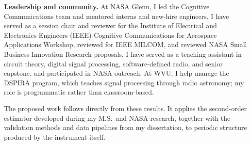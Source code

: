 \documentclass[12pt]{article}
\begin{document}
\textbf{Leadership and community.} At NASA Glenn, I led the Cognitive Communications team and mentored interns and new-hire engineers. I have served as a session chair and reviewer for the Institute of Electrical and Electronics Engineers (IEEE) Cognitive Communications for Aerospace Applications Workshop, reviewed for IEEE MILCOM, and reviewed NASA Small Business Innovation Research proposals. I have served as a teaching assistant in circuit theory, digital signal processing, software-defined radio, and senior capstone, and participated in NASA outreach. At WVU, I help manage the DSPIRA program, which teaches signal processing through radio astronomy; my role is programmatic rather than classroom-based.

The proposed work follows directly from these results. It applies the second-order estimator developed during my M.S.\ and NASA research, together with the validation methods and data pipelines from my dissertation, to periodic structure produced by the instrument itself.
\end{document}
